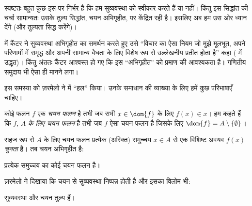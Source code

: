 \documentclass[../../../include/open-logic-section]{subfiles}
\begin{document}

स्पष्टतः बहुत कुछ इस पर निर्भर है कि हम सुव्यवस्था को स्वीकार करते हैं या
नहीं। किंतु इस सिद्धांत की चर्चा सामान्यतः उसके तुल्य सिद्धांत, चयन
अभिगृहीत, पर केंद्रित रही है। इसलिए अब हम उस ओर ध्यान देंगे (और तुल्यता
सिद्ध करेंगे)।

\citeyear{Cantor1883} में कैंटर ने सुव्यवस्था अभिगृहीत का समर्थन करते हुए
उसे ``विचार का ऐसा नियम जो मुझे मूलभूत, अपने परिणामों में समृद्ध और अपनी
सामान्य वैधता के लिए विशेष रूप से उल्लेखनीय प्रतीत होता है'' कहा
(\citeauthor{Potter2004} \citeyear[p.~243]{Potter2004} में उद्धृत)। किंतु
अंततः कैंटर आश्वस्त हो गए कि इस ``अभिगृहीत'' को प्रमाण की आवश्यकता है।
गणितीय समुदाय भी ऐसा ही मानने लगा।

इस समस्या को ज़रमेलो ने \citeyear{Zermelo1904} में ``हल'' किया। उनके
समाधान की व्याख्या के लिए हमें कुछ परिभाषाएँ चाहिए।

\begin{defn}
कोई फलन $f$ एक \emph{चयन फलन} है तभी जब सभी $x\in\dom{f}$ के लिए
$f(x)\in x$। हम कहते हैं कि $f$, $A$ \emph{के लिए चयन फलन} है तभी जब $f$
ऐसा चयन फलन है जिसके लिए $\dom{f}=A\setminus\{\emptyset\}$।
\end{defn}

सहज रूप से $A$ के लिए चयन फलन प्रत्येक (अरिक्त) समुच्चय $x\in A$ से एक
विशिष्ट अवयव $f(x)$ \emph{चुनता} है। तब चयन अभिगृहीत है:

\begin{axiom}[चयन]
	प्रत्येक समुच्चय का कोई चयन फलन है।
\end{axiom}

ज़रमेलो ने दिखाया कि चयन से सुव्यवस्था निष्पन्न होती है और इसका विलोम भी:

\begin{thm}[$\ZF$ में]
सुव्यवस्था और चयन तुल्य हैं।
\end{thm}
\end{document}
